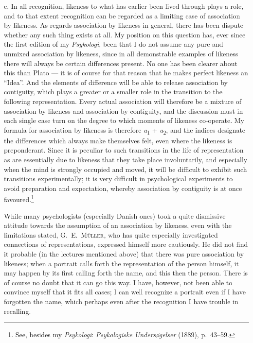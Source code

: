 \documentclass[12pt]{book}
\newcommand{\opage}[1]{\marginnote{\footnotesize\textit{[#1]}}}
\begin{document}
c. In all recognition, likeness to what has earlier been lived through plays a
role, and to that extent recognition can be regarded as a limiting case of
association by likeness. As regards association by likeness in general, there
has been dispute whether any such thing exists at all. My position on this
question has, ever since the first edition of my \textit{Psykologi}, been that I
do not assume any pure and unmixed association by likeness, since in all
demonstrable examples of likeness there will always be certain differences
present. No one has been clearer about this than Plato --- it is of course for
that reason that he makes perfect likeness an ``Idea''. And the elements of
difference will be able to release association by contiguity, which plays a
greater or a smaller role in the transition to the following representation.
Every actual association will therefore be a mixture of association by likeness
and association by contiguity, and the discussion must in each single case turn
on the degree to which moments of likeness co-operate. My formula for
association by likeness is therefore \textit{a}\textsubscript{1} +
\textit{a}\textsubscript{2}, and the indices designate the differences which
always make themselves felt, even where the likeness is preponderant. Since it
is peculiar to such transitions in the life of representation as are essentially
due to likeness that they take place involuntarily, and especially when the mind
\opage{24}is strongly occupied and moved, it will be difficult to exhibit such transitions
experimentally; it is very difficult in psychological experiments to avoid
preparation and expectation, whereby association by contiguity is at once
favoured.\footnote{See, besides my \textit{Psykologi}: \textit{Psykologiske
Undersøgelser} (1889), p.\ 43--59.}

While many psychologists (especially Danish ones) took a quite dismissive
attitude towards the assumption of an association by likeness, even with the
limitations stated, G.\ E.\ \textsc{Müller}, who has quite especially
investigated connections of representations, expressed himself more cautiously.
He did not find it probable (in the lectures mentioned above) that there was
pure association by likeness; when a portrait calls forth the representation of
the person himself, it may happen by its first calling forth the name, and this
then the person. There is of course no doubt that it can go this way. I have,
however, not been able to convince myself that it fits all cases; I can well
recognize a portrait even if I have forgotten the name, which perhaps even after
the recognition I have trouble in recalling.
\end{document}
